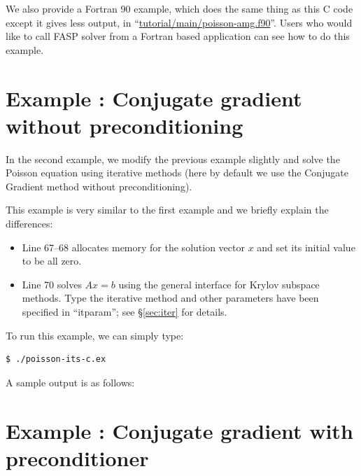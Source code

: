 \documentclass[11pt]{memoir}
\begin{document}
We also provide a Fortran 90 example, which does the same thing as
this C code except it gives less output, in
``\url{tutorial/main/poisson-amg.f90}''. Users who would like to call
FASP solver from a Fortran based application can see how to do this example.
%

%

\section{Example : Conjugate gradient without preconditioning}\label{sec:ex2}
\addtocounter{ex}{1}
In the second example, we modify the previous example slightly and
solve the Poisson equation using iterative methods (here by default we
use the Conjugate Gradient method without preconditioning).
%

%
This example is very similar to the first example and we briefly explain the differences:
\begin{itemize}
%
\item Line 67--68 allocates memory for the solution vector $x$ and set its initial value to be all zero.
%
\item Line 70 solves $Ax=b$ using the general interface for Krylov subspace methods. Type the iterative method and other parameters have been specified in ``itparam''; see \S\ref{sec:iter} for details.
%
\end{itemize}
%
To run this example, we can simply type:
%
\begin{lstlisting}[numbers=none]
$ ./poisson-its-c.ex
\end{lstlisting}
%
A sample output is as follows:


\section{Example : Conjugate gradient with preconditioner}\label{sec:ex3}
\addtocounter{ex}{1}
\end{document}
